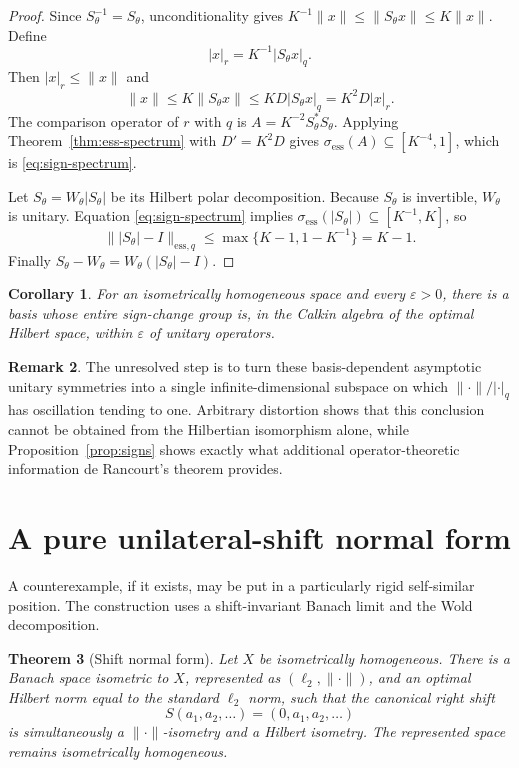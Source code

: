 \documentclass[11pt]{article}
\newtheorem{theorem}{Theorem}[section]
\newtheorem{corollary}[theorem]{Corollary}
\theoremstyle{definition}
\newtheorem{remark}[theorem]{Remark}
\begin{document}
\begin{proof}
Since $S_\theta^{-1}=S_\theta$, unconditionality gives
$K^{-1}\|x\|\leq\|S_\theta x\|\leq K\|x\|$.  Define
\[
 |x|_r=K^{-1}|S_\theta x|_q.
\]
Then $|x|_r\leq\|x\|$ and
\[
 \|x\|\leq K\|S_\theta x\|
 \leq KD|S_\theta x|_q=K^2D|x|_r.
\]
The comparison operator of $r$ with $q$ is
$A=K^{-2}S_\theta^*S_\theta$.  Applying
Theorem~\ref{thm:ess-spectrum} with $D'=K^2D$ gives
$\sigma_{\mathrm{ess}}(A)\subseteq[K^{-4},1]$, which is
\eqref{eq:sign-spectrum}.

Let $S_\theta=W_\theta|S_\theta|$ be its Hilbert polar decomposition.  Because
$S_\theta$ is invertible, $W_\theta$ is unitary.  Equation
\eqref{eq:sign-spectrum} implies
$\sigma_{\mathrm{ess}}(|S_\theta|)\subseteq[K^{-1},K]$, so
\[
 \||S_\theta|-I\|_{\mathrm{ess},q}
 \leq\max\{K-1,1-K^{-1}\}=K-1.
\]
Finally $S_\theta-W_\theta=W_\theta(|S_\theta|-I)$.
\end{proof}

\begin{corollary}
For an isometrically homogeneous space and every $\varepsilon>0$, there is a
basis whose entire sign-change group is, in the Calkin algebra of the optimal
Hilbert space, within $\varepsilon$ of unitary operators.
\end{corollary}

\begin{remark}
The unresolved step is to turn these basis-dependent asymptotic unitary
symmetries into a single infinite-dimensional subspace on which
$\|\cdot\|/|\cdot|_q$ has oscillation tending to one.  Arbitrary distortion
shows that this conclusion cannot be obtained from the Hilbertian isomorphism
alone, while Proposition~\ref{prop:signs} shows exactly what additional
operator-theoretic information de Rancourt's theorem provides.
\end{remark}

\section{A pure unilateral-shift normal form}\label{sec:shift}

A counterexample, if it exists, may be put in a particularly rigid self-similar
position.  The construction uses a shift-invariant Banach limit and the Wold
decomposition.

\begin{theorem}[Shift normal form]\label{thm:shift}
Let $X$ be isometrically homogeneous.  There is a Banach space isometric to
$X$, represented as $(\ell_2,\|\cdot\|)$, and an optimal Hilbert norm equal to
the standard $\ell_2$ norm, such that the canonical right shift
\[
 S(a_1,a_2,\ldots)=(0,a_1,a_2,\ldots)
\]
is simultaneously a $\|\cdot\|$-isometry and a Hilbert isometry.  The
represented space remains isometrically homogeneous.
\end{theorem}
\end{document}
